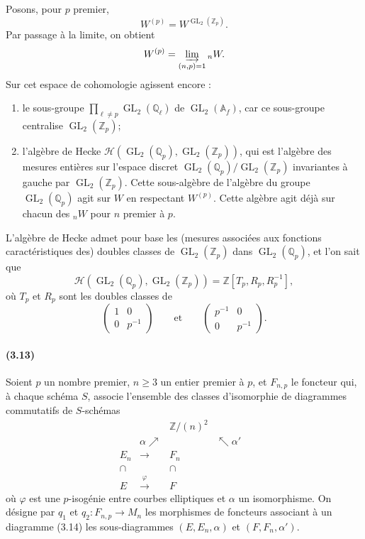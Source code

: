 \documentclass[10pt]{article}
\newcommand{\Af}{\mathbb A_f}
\newcommand{\Q}{\mathbb Q}
\newcommand{\Z}{\mathbb Z}
\newcommand{\GL}{\operatorname{GL}}
\newcommand{\cH}{\mathcal H}
\begin{document}
Posons, pour $p$ premier,
\[
W^{(p)}=W^{\GL_2(\Z_p)}.
\]
Par passage à la limite, on obtient
\[
W^{(p)}=\varinjlim_{(n,p)=1}{}_nW.
\]
Sur cet espace de cohomologie agissent encore :
\begin{enumerate}[label=(\roman*)]
\item le sous-groupe $\prod_{\ell\ne p}\GL_2(\Q_\ell)$ de $\GL_2(\Af)$, car ce
sous-groupe centralise $\GL_2(\Z_p)$;
\item l'algèbre de Hecke $\cH(\GL_2(\Q_p),\GL_2(\Z_p))$, qui est l'algèbre des mesures
entières sur l'espace discret $\GL_2(\Q_p)/\GL_2(\Z_p)$ invariantes à gauche par
$\GL_2(\Z_p)$. Cette sous-algèbre de l'algèbre du groupe $\GL_2(\Q_p)$ agit sur
$W$ en respectant $W^{(p)}$. Cette algèbre agit déjà sur chacun des ${}_nW$ pour $n$ premier à $p$.
\end{enumerate}

L'algèbre de Hecke admet pour base les (mesures associées aux fonctions caractéristiques
des) doubles classes de $\GL_2(\Z_p)$ dans $\GL_2(\Q_p)$, et l'on sait que
\[
\cH(\GL_2(\Q_p),\GL_2(\Z_p))=\Z[T_p,R_p,R_p^{-1}],
\]
où $T_p$ et $R_p$ sont les doubles classes de
\[
\begin{pmatrix}1&0\\0&p^{-1}\end{pmatrix}
\qquad\text{et}\qquad
\begin{pmatrix}p^{-1}&0\\0&p^{-1}\end{pmatrix}.
\]


\paragraph{(3.13)}
Soient $p$ un nombre premier, $n\geq 3$ un entier premier à $p$, et $F_{n,p}$
le foncteur qui, à chaque schéma $S$, associe l'ensemble des classes d'isomorphie
de diagrammes commutatifs de $S$-schémas
\[
\begin{array}{ccccc}
&& \Z/(n)^2 &&\\[-0.2em]
& \alpha\nearrow && \nwarrow\alpha' &\\[-0.2em]
E_n & \longrightarrow & F_n &&\\[-0.2em]
\cap && \cap &&\\[-0.2em]
E & \xrightarrow{\ \varphi\ } & F &&
\end{array}
\tag{3.14}
\]
où $\varphi$ est une $p$-isogénie entre courbes elliptiques et $\alpha$ un isomorphisme.
On désigne par $q_1$ et $q_2:F_{n,p}\to M_n$ les morphismes de foncteurs associant à
un diagramme (3.14) les sous-diagrammes $(E,E_n,\alpha)$ et $(F,F_n,\alpha')$.
\end{document}
